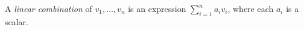 
A \emph{linear combination} of $v_1,\ldots,v_n$ is an expression $\sum_{i=1}^n a_iv_i$, where each $a_i$ is a scalar.
